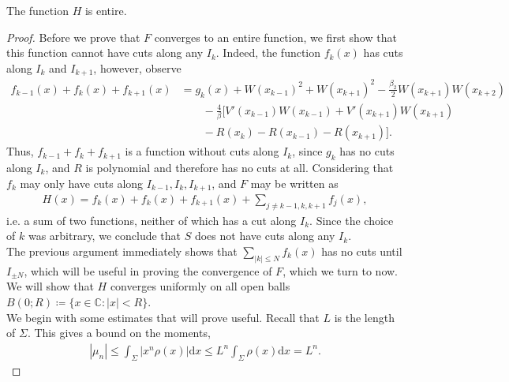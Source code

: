 \documentclass[10pt,a4paper]{amsart}
\newcommand{\cc}{\mathbb{C}}
\newcommand{\dif}{\mathrm{d}}
\begin{document}
\begin{prop}
	The function $H$ is entire. 
\end{prop}

\begin{proof}
	Before we prove that $F$ converges to an entire function, we first show that this function cannot have cuts along any $I_k$. Indeed, the function $f_k(x)$ has cuts along $I_k$ and $I_{k+1}$, however, observe
	\begin{align*}
		f_{k-1}(x)+f_k(x)+f_{k+1}(x) &=  g_k(x) + W(x_{k-1})^2 + W(x_{k+1})^2 -\frac{\beta_2}{2}W(x_{k+1})W(x_{k+2}) \\
		&\qquad - \frac{4}{\beta}[ V'(x_{k-1})W(x_{k-1})+V'(x_{k+1})W(x_{k+1})\\
		&\qquad - R(x_k)-R(x_{k-1})-R(x_{k+1}) ].
	\end{align*}
	Thus, $f_{k-1}+f_k + f_{k+1}$ is a function without cuts along $I_k$, since $g_k$ has no cuts along $I_k$, and $R$ is polynomial and therefore has no cuts at all. Considering that $f_k$ may only have cuts along $I_{k-1},I_{k},I_{k+1}$, and $F$ may be written as 
	\begin{align*}
		H(x) = f_{k}(x)+f_k(x)+f_{k+1}(x) + \sum_{j\neq k-1,k,k+1} f_j(x),
	\end{align*}
	i.e. a sum of two functions, neither of which has a cut along $I_k$. Since the choice of $k$ was arbitrary, we conclude that $S$ does not have cuts along any $I_k$. \\
	
	
	The previous argument immediately shows that $\sum_{|k|\leq N} f_k(x)$ has no cuts until $I_{\pm N}$, which will be useful in proving the convergence of $F$, which we turn to now. We will show that $H$ converges uniformly on all open balls $B(0;R) \coloneqq \{ x\in \cc : |x|<R \}$. \\
	
	We begin with some estimates that will prove useful. Recall that $L$ is the length of $\Sigma$. This gives a bound on the moments,
	\begin{align*}
		|\mu_n| \leq  \int_\Sigma \bigg| x^n \rho(x)\bigg| \dif x \leq L^n \int_\Sigma \rho(x)\dif x = L^n.
	\end{align*}
	

\end{proof}
\end{document}
